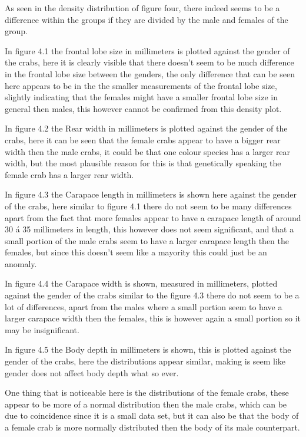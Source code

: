 \documentclass[
]{article}
\begin{document}
As seen in the density distribution of figure four, there indeed seems
to be a difference within the groups if they are divided by the male and
females of the group.

In figure 4.1 the frontal lobe size in millimeters is plotted against
the gender of the crabs, here it is clearly visible that there doesn't
seem to be much difference in the frontal lobe size between the genders,
the only difference that can be seen here appears to be in the the
smaller measurements of the frontal lobe size, slightly indicating that
the females might have a smaller frontal lobe size in general then
males, this however cannot be confirmed from this density plot.

In figure 4.2 the Rear width in millimeters is plotted against the
gender of the crabs, here it can be seen that the female crabs appear to
have a bigger rear width then the male crabs, it could be that one
colour species has a larger rear width, but the most plausible reason
for this is that genetically speaking the female crab has a larger rear
width.

In figure 4.3 the Carapace length in millimeters is shown here against
the gender of the crabs, here similar to figure 4.1 there do not seem to
be many differences apart from the fact that more females appear to have
a carapace length of around 30 á 35 millimeters in length, this however
does not seem significant, and that a small portion of the male crabs
seem to have a larger carapace length then the females, but since this
doesn't seem like a mayority this could just be an anomaly.

In figure 4.4 the Carapace width is shown, measured in millimeters,
plotted against the gender of the crabs similar to the figure 4.3 there
do not seem to be a lot of differences, apart from the males where a
small portion seem to have a larger carapace width then the females,
this is however again a small portion so it may be insignificant.

In figure 4.5 the Body depth in millimeters is shown, this is plotted
against the gender of the crabs, here the distributions appear similar,
making is seem like gender does not affect body depth what so ever.

One thing that is noticeable here is the distributions of the female
crabs, these appear to be more of a normal distribution then the male
crabs, which can be due to coincidence since it is a small data set, but
it can also be that the body of a female crab is more normally
distributed then the body of its male counterpart.
\end{document}
